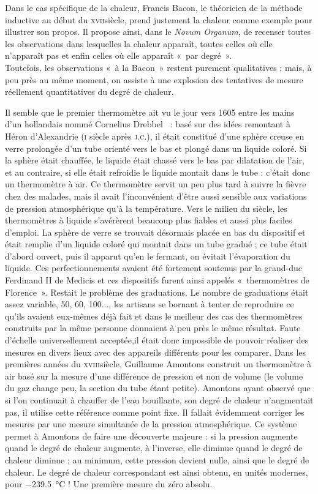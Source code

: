 	Dans le cas spécifique de la chaleur, Francis Bacon, le théoricien de la méthode inductive au début du \textsc{xvii}\ieme siècle, prend justement la chaleur comme exemple pour illustrer son propos. Il propose ainsi, dans le \textit{Novum Organum}, de recenser toutes les observations dans lesquelles la chaleur apparaît, toutes celles où elle n'apparaît pas et enfin celles où elle apparaît «~par degré~».\\
	Toutefois, les observations «~à la Bacon~» restent purement qualitatives ; mais, à peu près au même moment, on assiste à une explosion des tentatives de mesure réellement quantitatives du degré de chaleur.
	
	Il semble que le premier thermomètre ait vu le jour vers 1605 entre les mains d'un hollandais nommé Cornelius Drebbel~\cite{locqueneux1996} : basé sur des idées remontant à Héron d'Alexandrie (\textsc{i}\xspace siècle après \textsc{j.c.}), il était constitué d'une sphère creuse en verre prolongée d'un tube orienté vers le bas et plongé dans un liquide coloré. Si la sphère était chauffée, le liquide était chassé vers le bas par dilatation de l'air, et au contraire, si elle était refroidie le liquide montait dans le tube : c'était donc un thermomètre à air. Ce thermomètre servit un peu plus tard à suivre la fièvre chez des malades, mais il avait l'inconvénient d'être aussi sensible aux variations de pression atmosphérique qu'à la température. Vers le milieu du siècle, les thermomètres à liquide s'avérèrent beaucoup plus fiables et aussi plus faciles d'emploi. La sphère de verre se trouvait désormais placée en bas du dispositif et était remplie d'un liquide coloré qui montait dans un tube gradué ; ce tube était d'abord ouvert, puis il apparut qu'en le fermant, on évitait l'évaporation du liquide. Ces perfectionnements avaient été fortement soutenus par la grand-duc Ferdinand II de Medicis et ces dispositifs furent ainsi appelés «~thermomètres de Florence~».
	Restait le problème des graduations. Le nombre de graduations était assez variable, 50, 60, 100..., les artisans se bornant à tenter de reproduire ce qu'ils avaient eux-mêmes déjà fait et dans le meilleur des cas des thermomètres construits par la même personne donnaient à peu près le même résultat. Faute d'échelle universellement acceptée,il était donc impossible de pouvoir réaliser des mesures en divers lieux avec des appareils différents pour les comparer.
	Dans les premières années du \textsc{xviii}\ieme siècle, Guillaume Amontons construit un thermomètre à air basé sur la mesure d'une différence de pression et non de volume (le volume du gaz change peu, la section du tube étant petite). Amontons ayant observé que si l'on continuait à chauffer de l'eau bouillante, son degré de chaleur n'augmentait pas, il utilise cette référence comme point fixe. Il fallait évidemment corriger les mesures par une mesure simultanée de la pression atmosphérique. Ce système permet à Amontons de faire une découverte majeure : si la pression augmente quand le degré de chaleur augmente, à l'inverse, elle diminue quand le degré de chaleur diminue ; au minimum, cette pression devient nulle, ainsi que le degré de chaleur. Le degré de chaleur correspondant est ainsi obtenu, en unités modernes, pour \SI{-239,5}{\degreeCelsius} ! Une première mesure du zéro absolu.
	
